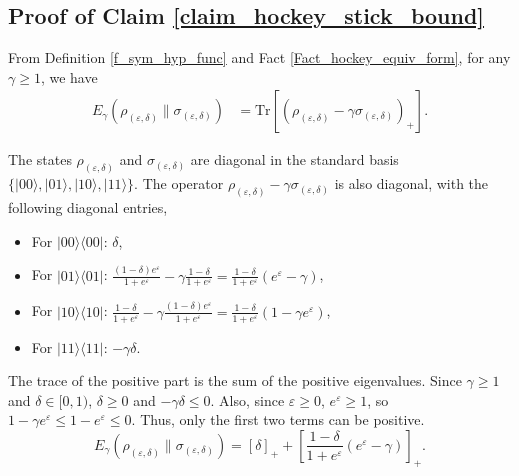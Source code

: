 \documentclass[onecolumn,ldraftcls, 11pt]{IEEEtran}
\newcommand{\tr}{\mathrm{Tr}}
\newcommand{\ketbra}[1]{|#1\rangle\langle#1|}
\newcommand{\eps}{\varepsilon}
\newcommand{\ket}[1]{|#1 \rangle}
\begin{document}
\subsection{Proof of Claim \ref{claim_hockey_stick_bound}}\label{proof_claim_hockey_stick_bound}
From Definition \ref{f_sym_hyp_func} and Fact \ref{Fact_hockey_equiv_form}, for any $\gamma \geq 1$, we have
\begin{align}
    E_{\gamma}(\rho_{(\eps,\delta)}\|\sigma_{(\eps,\delta)}) &= \tr\left[\left(\rho_{(\eps,\delta)} - \gamma \sigma_{(\eps,\delta)}\right)_{+}\right].
\end{align}

The states $\rho_{(\eps,\delta)}$ and $\sigma_{(\eps,\delta)}$ are diagonal in the standard basis $\{\ket{00}, \ket{01}, \ket{10}, \ket{11}\}$. The operator $\rho_{(\eps,\delta)} - \gamma \sigma_{(\eps,\delta)}$ is also diagonal, with the following diagonal entries,
\begin{itemize}
    \item For $\ketbra{00}$: $\delta$,
    \item For $\ketbra{01}$: $\frac{(1-\delta)e^\eps}{1+e^\eps} - \gamma \frac{1-\delta}{1+e^\eps} = \frac{1-\delta}{1+e^\eps}(e^\eps - \gamma)$,
    \item For $\ketbra{10}$: $\frac{1-\delta}{1+e^\eps} - \gamma \frac{(1-\delta)e^\eps}{1+e^\eps} = \frac{1-\delta}{1+e^\eps}(1 - \gamma e^\eps)$,
    \item For $\ketbra{11}$: $-\gamma\delta$.
\end{itemize}

The trace of the positive part is the sum of the positive eigenvalues. Since $\gamma \geq 1$ and $\delta \in [0,1)$, $\delta \geq 0$ and $-\gamma\delta \leq 0$. Also, since $\eps \geq 0$, $e^\eps \geq 1$, so $1 - \gamma e^\eps \leq 1 - e^\eps \leq 0$.
Thus, only the first two terms can be positive.
\begin{equation}
    E_{\gamma}(\rho_{(\eps,\delta)}\|\sigma_{(\eps,\delta)}) = [\delta]_{+} + \left[\frac{1-\delta}{1+e^\eps}(e^\eps - \gamma)\right]_{+}.
\end{equation}
\end{document}
